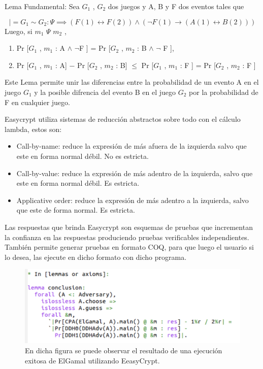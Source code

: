 \documentclass[runningheads,a4paper]{llncs}
\begin{document}
\begin{lemma}{Lema Fundamental:}
Sea $G_1$ , $G_2$ dos juegos y A, B y F dos eventos tales que

\[|= G_1 ∼ G_2 : \Psi \implies (F(1) \leftrightarrow F(2)) \land (\neg F(1) \rightarrow (A(1) \leftrightarrow B(2)))\]
Luego, si $m_1$ $\Psi$ $m_2$ ,
\begin{enumerate}
	\item Pr [$G_1$ , $m_1$ : A $\land$ $\neg$F ] = Pr [$G_2$ , $m_2$ : B $\land$ $\neg$ F ],
	\item Pr [$G_1$ , $m_1$ : A] − Pr [$G_2$ , $m_2$ : B] $\leq$  Pr [$G_1$ , $m_1$ : F ] = Pr [$G_2$ , $m_2$ : F ]
\end{enumerate}
\end{lemma}

Este Lema permite unir las diferencias entre la probabilidad de un evento A en el juego $G_1$ y la posible difrencia del evento B en el juego $G_2$ por la probabilidad de F en cualquier juego.\cite{article4}


Easycrypt utiliza sistemas de reducción abstractos sobre todo con el cálculo lambda, estos son:

\begin{itemize}

	\item Call-by-name: reduce la expresión de más afuera de la izquierda salvo que este en forma normal débil. No es estricta.

	\item Call-by-value: reduce la expresión de más adentro de la izquierda, salvo que este en forma normal débil. Es estricta.

	\item Applicative order: reduce la expresión de más adentro a la izquierda, salvo que este de forma normal. Es estricta.
\end{itemize}

Las respuestas que brinda Easycrypt son esquemas de pruebas que incrementan la confianza en las respuestas produciendo pruebas verificables independientes. También permite generar pruebas en formato COQ, para que luego el usuario si lo desea, las ejecute en dicho formato con dicho programa.\cite{article4}

\begin{figure}
\includegraphics[width=\textwidth]{fig1.png}
\caption{En dicha figura se puede observar el resultado de una ejecución exitosa de ElGamal utilizando EeasyCrypt.} \label{fig1}
\end{figure}
\end{document}
